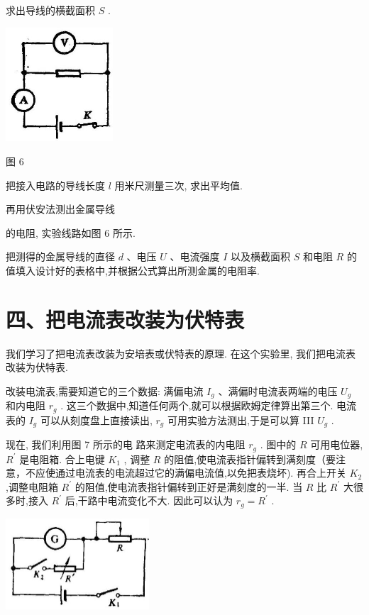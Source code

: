 \documentclass[10pt]{article}
\begin{document}
求出导线的横截面积 \(S\) .

\begin{center}
\includegraphics[max width=0.3\textwidth]{images/01913056-1f15-74d8-9184-9aab52c9d66b_377_433831.jpg}
\end{center}

图 6

把接入电路的导线长度 \(l\) 用米尺测量三次, 求出平均值.

再用伏安法测出金属导线

的电阻, 实验线路如图 6 所示.

把测得的金属导线的直径 \(d\) 、电压 \(U\) 、电流强度 \(I\) 以及横截面积 \(S\) 和电阻 \(R\) 的值填入设计好的表格中,并根据公式算出所测金属的电阻率.

\section*{四、把电流表改装为伏特表}

我们学习了把电流表改装为安培表或伏特表的原理. 在这个实验里, 我们把电流表改装为伏特表.

改装电流表,需要知道它的三个数据: 满偏电流 \({I}_{g}\) 、满偏时电流表两端的电压 \({U}_{g}\) 和内电阻 \({r}_{g}\) . 这三个数据中,知道任何两个,就可以根据欧姆定律算出第三个. 电流表的 \({I}_{g}\) 可以从刻度盘上直接读出, \({r}_{g}\) 可用实验方法测出,于是可以算 III \({U}_{g}\) .

现在, 我们利用图 7 所示的电 路来测定电流表的内电阻 \({r}_{g}\) . 图中的 \(R\) 可用电位器, \({R}^{\prime }\) 是电阻箱. 合上电键 \({K}_{1}\) , 调整 \(R\) 的阻值,使电流表指针偏转到满刻度（要注意，不应使通过电流表的电流超过它的满偏电流值,以免把表烧坏). 再合上开关 \({K}_{2}\) ,调整电阻箱 \({R}^{\prime }\) 的阻值,使电流表指针偏转到正好是满刻度的一半. 当 \(R\) 比 \({R}^{\prime }\) 大很多时,接入 \({R}^{\prime }\) 后,干路中电流变化不大. 因此可以认为 \({r}_{g} = {R}^{\prime }\) .

\begin{center}
\includegraphics[max width=0.4\textwidth]{images/01913056-1f15-74d8-9184-9aab52c9d66b_378_410840.jpg}
\end{center}
\end{document}
